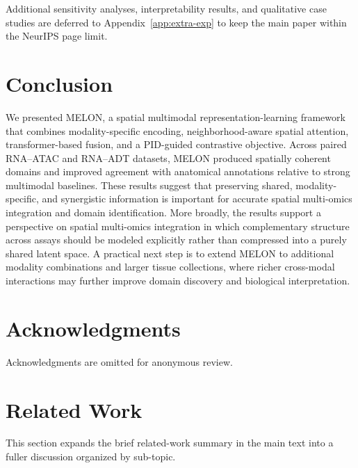 \documentclass{article}
\theoremstyle{plain}
\theoremstyle{definition}
\newcommand{\melon}{MELON}
\begin{document}
Additional sensitivity analyses, interpretability results, and qualitative case studies are deferred to Appendix~\ref{app:extra-exp} to keep the main paper within the NeurIPS page limit.

\section{Conclusion}
We presented \melon{}, a spatial multimodal representation-learning framework that combines modality-specific encoding, neighborhood-aware spatial attention, transformer-based fusion, and a PID-guided contrastive objective. Across paired RNA--ATAC and RNA--ADT datasets, MELON produced spatially coherent domains and improved agreement with anatomical annotations relative to strong multimodal baselines. These results suggest that preserving shared, modality-specific, and synergistic information is important for accurate spatial multi-omics integration and domain identification. More broadly, the results support a perspective on spatial multi-omics integration in which complementary structure across assays should be modeled explicitly rather than compressed into a purely shared latent space. A practical next step is to extend MELON to additional modality combinations and larger tissue collections, where richer cross-modal interactions may further improve domain discovery and biological interpretation.

\section{Acknowledgments}
Acknowledgments are omitted for anonymous review.




\newpage
\appendix
\onecolumn

\section{Related Work}\label{app:related_work}

This section expands the brief related-work summary in the main text into a fuller discussion organized by sub-topic.
\end{document}
